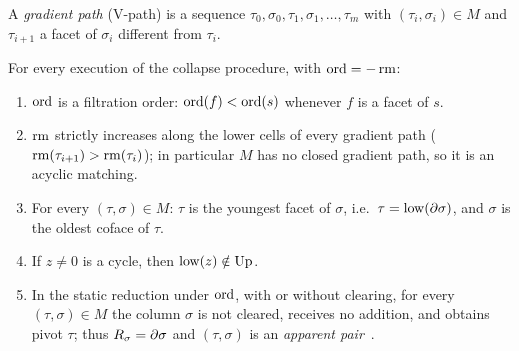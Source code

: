 A \emph{gradient path} (V-path) is a sequence $\tau_0,\sigma_0,\tau_1,\sigma_1,
\dots,\tau_m$ with $(\tau_i,\sigma_i)\in M$ and $\tau_{i+1}$ a facet of
$\sigma_i$ different from $\tau_i$.

\begin{lemma}\label{lem:apparent}
For every execution of the collapse procedure, with $\operatorname{ord}=-\operatorname{rm}$:
\begin{enumerate}
\item[(a)] $\operatorname{ord}$ is a filtration order: $\operatorname{ord}(f)<\operatorname{ord}(s)$ whenever $f$ is a facet
  of $s$.
\item[(b)] $\operatorname{rm}$ strictly increases along the lower cells of every gradient
  path ($\operatorname{rm}(\tau_{i+1})>\operatorname{rm}(\tau_i)$); in particular $M$ has no closed
  gradient path, so it is an acyclic matching.
\item[(c)] For every $(\tau,\sigma)\in M$: $\tau$ is the youngest facet of
  $\sigma$, i.e.\ $\tau=\operatorname{low}(\partial\sigma)$, and $\sigma$ is the oldest coface of
  $\tau$.
\item[(d)] If $z\ne0$ is a cycle, then $\operatorname{low}(z)\notin\mathrm{Up}$.
\item[(e)] In the static reduction under $\operatorname{ord}$, with or without clearing, for
  every $(\tau,\sigma)\in M$ the column $\sigma$ is not cleared, receives no
  addition, and obtains pivot $\tau$; thus $R_\sigma=\partial\sigma$ and
  $(\tau,\sigma)$ is an \emph{apparent pair}~\cite{bauer2021ripser}.
\end{enumerate}
\end{lemma}

